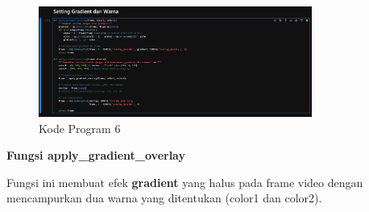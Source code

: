 \documentclass[11pt,a4paper]{article}
\begin{document}
\begin{figure}[H]
    \centering
    \includegraphics[width=0.8\textwidth]{6.png} %
    \caption{Kode Program 6}
    \label{fig:6}
\end{figure}

\textbf{Fungsi apply\_gradient\_overlay}

Fungsi ini membuat efek \textbf{gradient} yang halus pada frame video dengan mencampurkan dua warna yang ditentukan (color1 dan color2).
\end{document}
